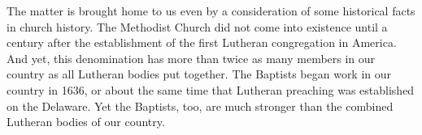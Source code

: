 \documentclass[
]{book}
\begin{document}
The matter is brought home to us even by a consideration of some historical facts in church history. The Methodist Church did not come into existence until a century after the establishment of the first Lutheran congregation in America. And yet, this denomination has more than twice as many members in our country as all Lutheran bodies put together. The Baptists began work in our country in 1636, or about the same time that Lutheran preaching was established on the Delaware. Yet the Baptists, too, are much stronger than the combined Lutheran bodies of our country.
\end{document}
